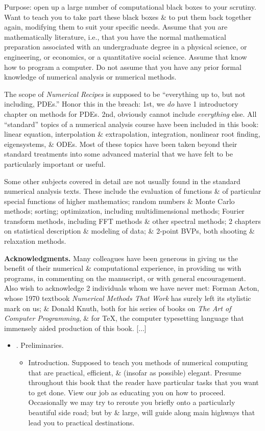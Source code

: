 \documentclass{article}
\begin{document}
\begin{enumerate}
	Purpose: open up a large number of computational black boxes to your scrutiny. Want to teach you to take part these black boxes \& to put them back together again, modifying them to suit your specific needs. Assume that you are mathematically literature, i.e., that you have the normal mathematical preparation associated with an undergraduate degree in a physical science, or engineering, or economics, or a quantitative social science. Assume that know how to program a computer. Do not assume that you have any prior formal knowledge of numerical analysis or numerical methods.
	
	The scope of {\it Numerical Recipes} is supposed to be ``everything up to, but not including, PDEs.'' Honor this in the breach: 1st, we {\it do} have 1 introductory chapter on methods for PDEs. 2nd, obviously cannot include {\it everything} else. All ``standard'' topics of a numerical analysis course have been included in this book: linear equation, interpolation \& extrapolation, integration, nonlinear root finding, eigensystems, \& ODEs. Most of these topics have been taken beyond their standard treatments into some advanced material that we have felt to be particularly important or useful.
	
	Some other subjects covered in detail are not usually found in the standard numerical analysis texts. These include the evaluation of functions \& of particular special functions of higher mathematics; random numbers \& Monte Carlo methods; sorting; optimization, including multidimensional methods; Fourier transform methods, including FFT methods \& other spectral methods; 2 chapters on statistical description \& modeling of data; \& 2-point BVPs, both shooting \& relaxation methods.
	
	{\bf Acknowledgments.} Many colleagues have been generous in giving us the benefit of their numerical \& computational experience, in providing us with programs, in commenting on the manuscript, or with general encouragement. Also wish to acknowledge 2 individuals whom we have never met: {\sc Forman Acton}, whose 1970 textbook {\it Numerical Methods That Work} has surely left its stylistic mark on us; \& {\sc Donald Knuth}, both for his series of books on {\it The Art of Computer Programming}, \& for \TeX, the computer typesetting language that immensely aided production of this book. [$\ldots$]
	
	\begin{itemize}
		\item {. Preliminaries.}
		\begin{itemize}
			\item {\sf Introduction.} Supposed to teach you methods of numerical computing that are practical, efficient, \& (insofar as possible) elegant. Presume throughout this book that the reader have particular tasks that you want to get done. View our job as educating you on how to proceed. Occasionally we may try to reroute you briefly onto a particularly beautiful side road; but by \& large, will guide along main highways that lead you to practical destinations.
			

\end{itemize}
\end{itemize}
\end{enumerate}
\end{document}
